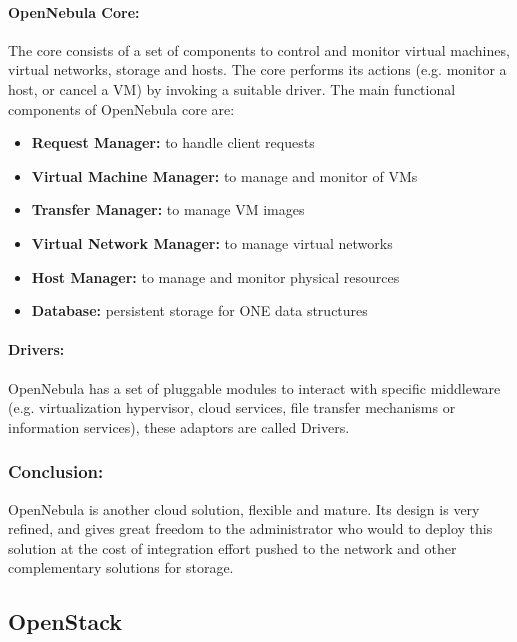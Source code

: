 \paragraph{OpenNebula Core: }The core consists of a set of components to control and monitor virtual machines, virtual networks, storage and hosts. The core performs its actions (e.g. monitor a host, or cancel a VM) by invoking a suitable driver. The main functional components of OpenNebula core are: 
\begin{itemize}
 \item \textbf{Request Manager: }to handle client requests
 \item \textbf{Virtual Machine Manager: }to manage and monitor of VMs
 \item \textbf{Transfer Manager: }to manage VM images
 \item \textbf{Virtual Network Manager: }to manage virtual networks
 \item \textbf{Host Manager: }to manage and monitor physical resources
 \item \textbf{Database: }persistent storage for ONE data structures
\end{itemize}

\paragraph{Drivers: }
OpenNebula has a set of pluggable modules to interact with specific middleware (e.g. virtualization hypervisor, cloud services, file transfer mechanisms or information services), these adaptors are called Drivers. 

\subsubsection{Conclusion:}
OpenNebula is another cloud solution, flexible and mature.
Its design is very refined, and gives great freedom to the administrator who would to deploy this solution at the cost of integration effort pushed
 to the network and other complementary solutions for storage.


\newpage
\subsection{OpenStack}

